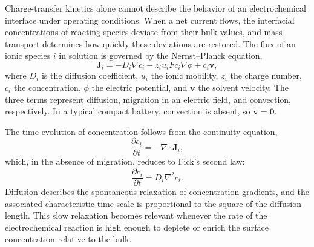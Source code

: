 Charge-transfer kinetics alone cannot describe the behavior of an electrochemical interface under operating conditions. 
When a net current flows, the interfacial concentrations of reacting species deviate from their bulk values, and mass transport determines how quickly these deviations are restored. 
The flux of an ionic species $i$ in solution is governed by the Nernst--Planck equation,
\begin{equation}
    \mathbf{J}_i = -D_i \nabla c_i - z_i u_i F c_i \nabla \phi + c_i \mathbf{v},
    \label{eq:nernst-planck}
\end{equation}
where $D_i$ is the diffusion coefficient, $u_i$ the ionic mobility, $z_i$ the charge number, $c_i$ the concentration, $\phi$ the electric potential, and $\mathbf{v}$ the solvent velocity.
The three terms represent diffusion, migration in an electric field, and convection, respectively.
In a typical compact battery, convection is absent, so $\mathbf{v} = \mathbf{0}$.

The time evolution of concentration follows from the continuity equation,
\begin{equation}
    \frac{\partial c_i}{\partial t} = -\nabla \cdot \mathbf{J}_i,
    \label{eq:continuity}
\end{equation}
which, in the absence of migration, reduces to Fick's second law:
\begin{equation}
    \frac{\partial c_i}{\partial t} = D_i \nabla^2 c_i.
    \label{eq:ficks-law}
\end{equation}
Diffusion describes the spontaneous relaxation of concentration gradients, and the associated characteristic time scale is proportional to the square of the diffusion length. 
This slow relaxation becomes relevant whenever the rate of the electrochemical reaction is high enough to deplete or enrich the surface concentration relative to the bulk.


